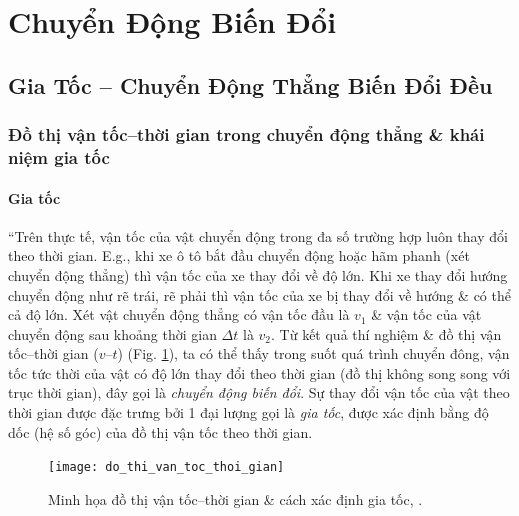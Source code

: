 \documentclass{article}
\numberwithin{equation}{section}
\begin{document}

\section{Chuyển Động Biến Đổi}

\subsection{Gia Tốc -- Chuyển Động Thẳng Biến Đổi Đều}

\subsubsection{Đồ thị vận tốc--thời gian trong chuyển động thẳng \& khái niệm gia tốc}

\paragraph{Gia tốc}
``Trên thực tế, vận tốc của vật chuyển động trong đa số trường hợp luôn thay đổi theo thời gian. E.g., khi xe ô tô bắt đầu chuyển động hoặc hãm phanh (xét chuyển động thẳng) thì vận tốc của xe thay đổi về độ lớn. Khi xe thay đổi hướng chuyển động như rẽ trái, rẽ phải thì vận tốc của xe bị thay đổi về hướng \& có thể cả độ lớn. Xét vật chuyển động thẳng có vận tốc đầu là $v_1$ \& vận tốc của vật chuyển động sau khoảng thời gian $\Delta t$ là $v_2$. Từ kết quả thí nghiệm \& đồ thị vận tốc--thời gian ($v$--$t$) (Fig. \ref{fig:do_thi_van_toc_thoi_gian}), ta có thể thấy trong suốt quá trình chuyển đông, vận tốc tức thời của vật có độ lớn thay đổi theo thời gian (đồ thị không song song với trục thời gian), đây gọi là \textit{chuyển động biến đổi}. Sự thay đổi vận tốc của vật theo thời gian được đặc trưng bởi 1 đại lượng gọi là \textit{gia tốc}, được xác định bằng độ dốc (hệ số góc) của đồ thị vận tốc theo thời gian.

\begin{figure}[H]
	\centering
	\texttt{[image: do\_thi\_van\_toc\_thoi\_gian]}
	\caption{Minh họa đồ thị vận tốc--thời gian \& cách xác định gia tốc, \cite[Hình 7.3, p. 42]{SGK_Vat_Ly_10_Chan_Troi_Sang_Tao}.}
	\label{fig:do_thi_van_toc_thoi_gian}
\end{figure}
\end{document}
